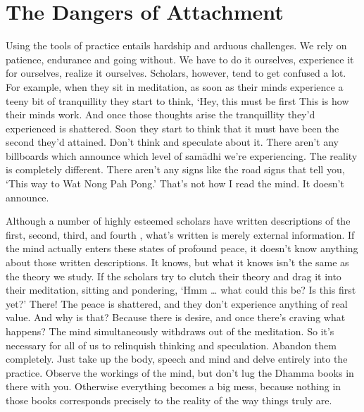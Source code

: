 \section{The Dangers of Attachment}

Using the tools of practice entails hardship and arduous challenges. We rely on patience, endurance and going without. We have to do it ourselves, experience it for ourselves, realize it ourselves. Scholars, however, tend to get confused a lot. For example, when they sit in meditation, as soon as their minds experience a teeny bit of tranquillity they start to think, `Hey, this must be first  This is how their minds work. And once those thoughts arise the tranquillity they'd experienced is shattered. Soon they start to think that it must have been the second  they'd attained. Don't think and speculate about it. There aren't any billboards which announce which level of sam\=adhi we're experiencing. The reality is completely different. There aren't any signs like the road signs that tell you, `This way to Wat Nong Pah Pong.' That's not how I read the mind. It doesn't announce.

Although a number of highly esteemed scholars have written descriptions of the first, second, third, and fourth , what's written is merely external information. If the mind actually enters these states of profound peace, it doesn't know anything about those written descriptions. It knows, but what it knows isn't the same as the theory we study. If the scholars try to clutch their theory and drag it into their meditation, sitting and pondering, `Hmm \ldots{} what could this be? Is this first  yet?' There! The peace is shattered, and they don't experience anything of real value. And why is that? Because there is desire, and once there's craving what happens? The mind simultaneously withdraws out of the meditation. So it's necessary for all of us to relinquish thinking and speculation. Abandon them completely. Just take up the body, speech and mind and delve entirely into the practice. Observe the workings of the mind, but don't lug the Dhamma books in there with you. Otherwise everything becomes a big mess, because nothing in those books corresponds precisely to the reality of the way things truly are.

